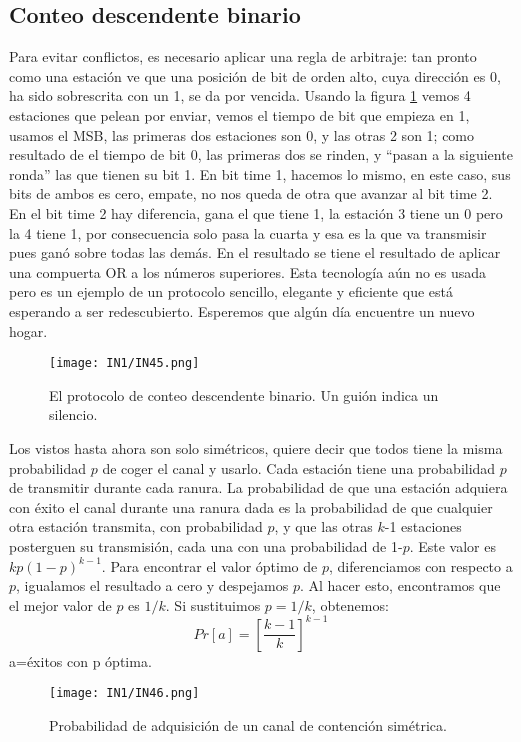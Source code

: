 \documentclass[
	12pt, %
	fleqn, %
	a4paper, %
	oneside, %
]{LegrandOrangeBook}
\begin{document}
\subsection{Conteo descendente binario}
Para evitar conflictos, es necesario aplicar una regla de arbitraje: tan pronto como una estación ve que una posición de bit de orden alto, cuya dirección es 0, ha sido sobrescrita con un 1, se da por vencida. Usando la figura \ref{fig:conteo descendente} vemos 4 estaciones que pelean por enviar, vemos el tiempo de bit que empieza en 1, usamos el MSB, las primeras dos estaciones son 0, y las otras 2 son 1; como resultado de el tiempo de bit 0, las primeras dos se rinden, y ``pasan a  la siguiente ronda'' las que tienen su bit 1. En bit time 1, hacemos lo mismo, en este caso, sus bits de ambos es cero, empate, no nos queda de otra que avanzar al bit time 2. En el bit time 2 hay diferencia, gana el que tiene 1, la estación 3 tiene un 0 pero la 4 tiene 1, por consecuencia solo pasa la cuarta y esa es la que va transmisir pues ganó sobre todas las demás. En el resultado se tiene el resultado de aplicar una compuerta OR a los números superiores. Esta tecnología aún no es usada pero es un ejemplo de un protocolo sencillo, elegante y eficiente que está esperando a ser redescubierto. Esperemos que algún día encuentre un nuevo hogar.
\begin{figure}[H]
\centering
\texttt{[image: IN1/IN45.png]}
\caption{El protocolo de conteo descendente binario. Un guión indica un silencio.}
\label{fig:conteo descendente}
\end{figure}
Los vistos hasta ahora son solo simétricos, quiere decir que todos tiene la misma probabilidad $p$ de coger el canal y usarlo. Cada estación tiene una probabilidad $p$ de transmitir durante cada ranura. La probabilidad de que una estación adquiera con éxito el canal durante una ranura dada es la probabilidad de que cualquier otra estación transmita, con probabilidad $p$, y que las otras $k$-1 estaciones posterguen su transmisión, cada una con una probabilidad de 1-$p$. Este valor es $kp(1-p)^{k-1}$. Para encontrar el valor óptimo de $p$, diferenciamos con respecto a $p$, igualamos el resultado a cero y despejamos $p$. Al hacer esto, encontramos que el mejor valor de $p$ es $1/k$. Si sustituimos $p=1/k$, obtenemos:
\begin{equation}
Pr[a]=\left[\frac{k-1}{k}\right]^{k-1}
\end{equation}
a=éxitos con p óptima.
\begin{figure}[H]
\centering
\texttt{[image: IN1/IN46.png]}
\caption{Probabilidad de adquisición de un canal de contención simétrica.}
\end{figure}
\end{document}
